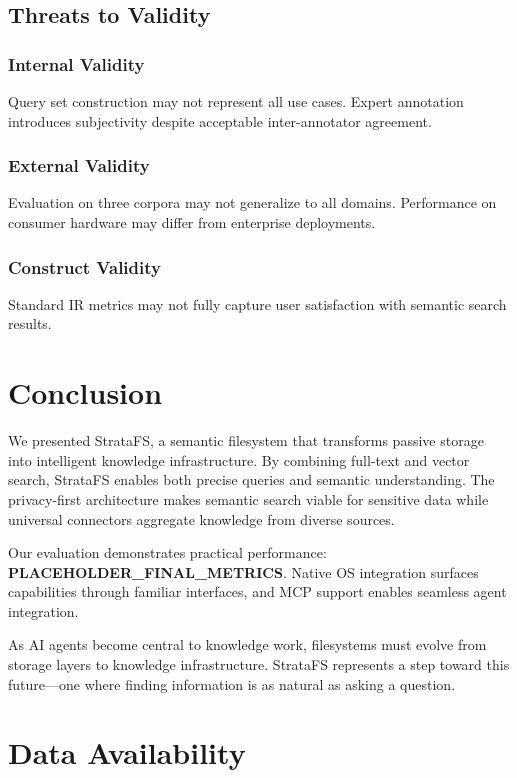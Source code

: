 \documentclass[conference]{IEEEtran}
\begin{document}
\subsection{Threats to Validity}

\subsubsection{Internal Validity}
Query set construction may not represent all use cases. Expert annotation introduces subjectivity despite acceptable inter-annotator agreement.

\subsubsection{External Validity}
Evaluation on three corpora may not generalize to all domains. Performance on consumer hardware may differ from enterprise deployments.

\subsubsection{Construct Validity}
Standard IR metrics may not fully capture user satisfaction with semantic search results.

\section{Conclusion}

We presented StrataFS, a semantic filesystem that transforms passive storage into intelligent knowledge infrastructure. By combining full-text and vector search, StrataFS enables both precise queries and semantic understanding. The privacy-first architecture makes semantic search viable for sensitive data while universal connectors aggregate knowledge from diverse sources.

Our evaluation demonstrates practical performance: \textbf{PLACEHOLDER\_FINAL\_METRICS}. Native OS integration surfaces capabilities through familiar interfaces, and MCP support enables seamless agent integration.

As AI agents become central to knowledge work, filesystems must evolve from storage layers to knowledge infrastructure. StrataFS represents a step toward this future---one where finding information is as natural as asking a question.

\section*{Data Availability}
\end{document}
